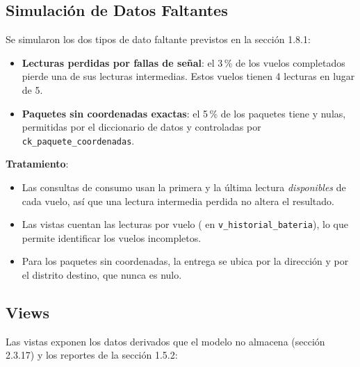\subsection{Simulación de Datos Faltantes}

Se simularon los dos tipos de dato faltante previstos en la sección 1.8.1:

\begin{itemize}
\item \textbf{Lecturas perdidas por fallas de señal}: el 3\,\% de los vuelos completados pierde una de sus lecturas intermedias. Estos vuelos tienen 4 lecturas en lugar de 5.
\item \textbf{Paquetes sin coordenadas exactas}: el 5\,\% de los paquetes tiene  y  nulas, permitidas por el diccionario de datos y controladas por \texttt{ck\_paquete\_coordenadas}.
\end{itemize}

\textbf{Tratamiento}:
\begin{itemize}
\item Las consultas de consumo usan la primera y la última lectura \emph{disponibles} de cada vuelo, así que una lectura intermedia perdida no altera el resultado.
\item Las vistas cuentan las lecturas por vuelo ( en \texttt{v\_historial\_bateria}), lo que permite identificar los vuelos incompletos.
\item Para los paquetes sin coordenadas, la entrega se ubica por la dirección y por el distrito destino, que nunca es nulo.
\end{itemize}

\subsection{Views}

Las vistas exponen los datos derivados que el modelo no almacena (sección 2.3.17) y los reportes de la sección 1.5.2:

